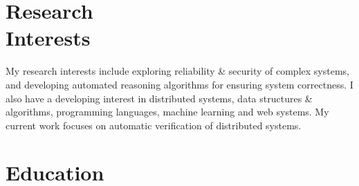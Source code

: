\documentclass[margin,line,letter]{resume}
\begin{document}
\begin{resume}

\section{\mysidestyle Research\\Interests}
    My research interests include exploring reliability \& security of complex systems, and developing automated reasoning algorithms for ensuring system correctness. I also have a developing interest in distributed systems, data structures \& algorithms, programming languages, machine learning and web systems. My current work focuses on automatic verification of distributed systems.


\section{\mysidestyle Education}


\end{resume}
\end{document}
